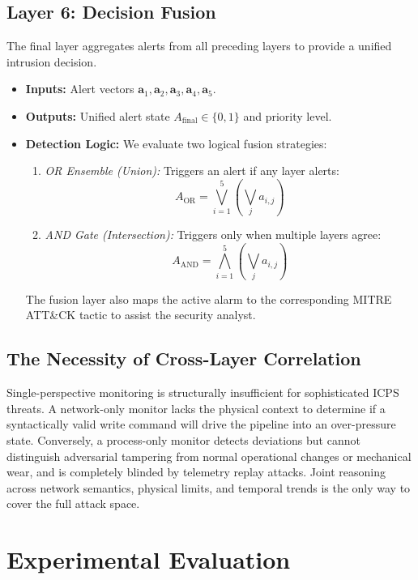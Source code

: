 \documentclass[journal,twoside,web]{ieeecolor}
\begin{document}
\subsection{Layer 6: Decision Fusion}
The final layer aggregates alerts from all preceding layers to provide a unified intrusion decision.
\begin{itemize}
    \item \textbf{Inputs:} Alert vectors $\bm{a}_1, \bm{a}_2, \bm{a}_3, \bm{a}_4, \bm{a}_5$.
    \item \textbf{Outputs:} Unified alert state $A_{\text{final}} \in \{0,1\}$ and priority level.
    \item \textbf{Detection Logic:} We evaluate two logical fusion strategies:
    \begin{enumerate}
        \item \emph{OR Ensemble (Union):} Triggers an alert if any layer alerts:
        \begin{equation}
        A_{\text{OR}} = \bigvee_{i=1}^5 \left( \bigvee_{j} a_{i,j} \right)
        \end{equation}
        \item \emph{AND Gate (Intersection):} Triggers only when multiple layers agree:
        \begin{equation}
        A_{\text{AND}} = \bigwedge_{i=1}^5 \left( \bigvee_{j} a_{i,j} \right)
        \end{equation}
    \end{enumerate}
    The fusion layer also maps the active alarm to the corresponding MITRE ATT\&CK tactic to assist the security analyst.
\end{itemize}

\subsection{The Necessity of Cross-Layer Correlation}
Single-perspective monitoring is structurally insufficient for sophisticated ICPS threats. A network-only monitor lacks the physical context to determine if a syntactically valid write command will drive the pipeline into an over-pressure state. Conversely, a process-only monitor detects deviations but cannot distinguish adversarial tampering from normal operational changes or mechanical wear, and is completely blinded by telemetry replay attacks. Joint reasoning across network semantics, physical limits, and temporal trends is the only way to cover the full attack space.

\section{Experimental Evaluation} \label{sec:results}
\end{document}
